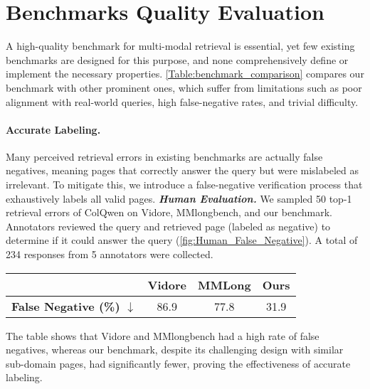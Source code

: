 






\section{Benchmarks Quality Evaluation} \label{sec:Benchmarks_Comparisons}

A high-quality benchmark for multi-modal retrieval is essential, yet few existing benchmarks are designed for this purpose, and none comprehensively define or implement the necessary properties. \cref{Table:benchmark_comparison} compares our benchmark with other prominent ones, which suffer from limitations such as poor alignment with real-world queries, high false-negative rates, and trivial difficulty.




\paragraph{Accurate Labeling.}
Many perceived retrieval errors in existing benchmarks are actually false negatives, meaning pages that correctly answer the query but were mislabeled as irrelevant. To mitigate this, we introduce a false-negative verification process that exhaustively labels all valid pages.
\textbf{\emph{Human Evaluation.}} We sampled 50 top-1 retrieval errors of ColQwen on Vidore, MMlongbench, and our benchmark.
Annotators reviewed the query and retrieved page (labeled as negative) to determine if it could answer the query (\cref{fig:Human_False_Negative}). A total of 234 responses from 5 annotators were collected.

\vspace{0.15cm}
\hspace{0.2cm}
    {\footnotesize
\centering
\begin{tabular}{lccc} 
\toprule & \textbf{Vidore} & \textbf{MMLong}  & \textbf{Ours}  \\
\midrule
\textbf{False Negative (\%) \(\downarrow\)} & 86.9 & 77.8 & 31.9 \\
\bottomrule
\end{tabular}}


\vspace{0.15cm}
\noindent
The table shows that Vidore and MMlongbench had a high rate of false negatives, whereas our benchmark, despite its challenging design with similar sub-domain pages, had significantly fewer, proving the effectiveness of accurate labeling.




